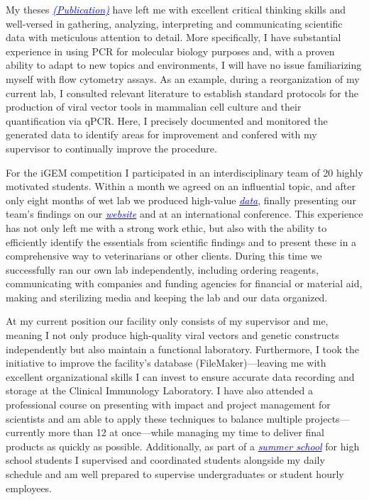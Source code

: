 \documentclass[11pt,a4paper,sans]{moderncv}
\begin{document}
\begin{spacing}{1.1}
My theses {\href{https://www.ncbi.nlm.nih.gov/pubmed/29517395}{\textcolor{blue}{{\textit{(Publication)}}}}} have left me with excellent critical thinking skills and well-versed in gathering, analyzing, interpreting and communicating scientific data with meticulous attention to detail. 
More specifically, I have substantial experience in using PCR for molecular biology purposes and, with a proven ability to adapt to new topics and environments, I will have no issue familiarizing myself with flow cytometry assays. 
As an example, during a reorganization of my current lab, I consulted relevant literature to establish standard protocols for the production of viral vector tools in mammalian cell culture and their quantification via qPCR. 
Here, I precisely documented and monitored the generated data to identify areas for improvement and confered with my supervisor to continually improve the procedure. \par%
For the iGEM competition I participated in an interdisciplinary team of 20 highly motivated students.
Within a month we agreed on an influential topic, and after only eight months of wet lab we produced high-value  {\href{https://www.ncbi.nlm.nih.gov/pubmed/29803867}{\textcolor{blue}{\textit{data}}}}, finally presenting our team's findings on our {\href{http://2015.igem.org/Team:Freiburg}{\textcolor{blue}{\textit{website}}}} and at an international conference. 
This experience has not only left me with a strong work ethic, but also with the ability to efficiently identify the essentials from scientific findings and to present these in a comprehensive way to veterinarians or other clients. 
During this time we successfully ran our own lab independently, including ordering reagents, communicating with companies and funding agencies for financial or material aid, making and sterilizing media and keeping the lab and our data organized. \par 
At my current position our facility only consists of my supervisor and me, meaning I not only produce high-quality viral vectors and genetic constructs independently but also maintain a functional laboratory. 
Furthermore, I took the initiative to improve the facility's database (FileMaker)---leaving me with excellent organizational skills I can invest to ensure accurate data recording and storage at the Clinical Immunology Laboratory.  
I have also attended a professional course on presenting with impact and project management for scientists and am able to apply these techniques to balance multiple projects---currently more than 12 at once---while managing my time to deliver final products as quickly as possible.  
Additionally, as part of a {\href{https://adamascienza.com/summer-in-science/}{\textcolor{blue}{\textit{summer school}}}} for high school students I supervised and coordinated students alongside my daily schedule and am well prepared to supervise undergraduates or student hourly employees. \par%


\end{spacing}
\end{document}
